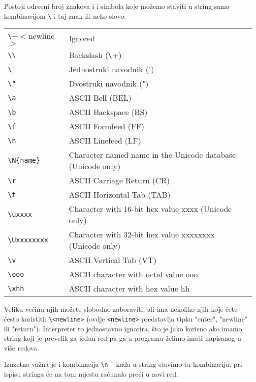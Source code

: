 	Postoji
	odre\dj{}eni broj znakova i i simbola koje mo\v{z}emo staviti u string samo
	kombinacijom \verb+\+ i taj znak ili neko slovo:

	{\normalsize
	\begin{tabular}{ll}
		\verb+\+$<$newline$>$ & Ignored \\
		\verb+\\+ & Backslash (\verb+\+) \\
		\verb+\'+ & Jednostruki navodnik (') \\
		\verb+\"+ & Dvostruki navodnik (") \\
		\verb+\a+ & ASCII Bell (BEL)\\
		\verb+\b+ & ASCII Backspace (BS)\\
		\verb+\f+ & ASCII Formfeed (FF)\\
		\verb+\n+ & ASCII Linefeed (LF)\\
		\verb+\N{name}+ & Character named name in the Unicode database (Unicode only)\\
		\verb+\r+ & ASCII Carriage Return (CR)\\
		\verb+\t+ & ASCII Horizontal Tab (TAB)\\
		\verb+\uxxxx+ & Character with 16-bit hex value xxxx (Unicode only)\\
		\verb+\Uxxxxxxxx+ & Character with 32-bit hex value xxxxxxxx (Unicode only)\\
		\verb+\v+ & ASCII Vertical Tab (VT)\\
		\verb+\ooo+ & ASCII character with octal value ooo\\
		\verb+\xhh+ & ASCII character with hex value hh\\
	\end{tabular}
	}

	\vspace{2mm}
Veliku ve\'{c}inu njih mo\v{z}ete slobodno zaboraviti, ali ima
nekoliko njih koje \'{c}ete \v{c}esto koristiti: \verb+\<newline>+
(ovdje \verb+<newline>+ predstavlja tipku "enter", "newline" ili
"return"). Interpreter to jednostavno ignorira, \v{s}to je jako
korisno ako imamo string koji je prevelik za jedan red pa ga u
programu \v{z}elimo imati napisanog u vi\v{s}e redova.

Izuzetno va\v{z}na je i kombinacija \verb+\n+ -- kada u string
stavimo tu kombinaciju, pri ispisu stringa \'{c}e na tom mjestu
ra\v{c}unalo pre\'{c}i u novi red.


